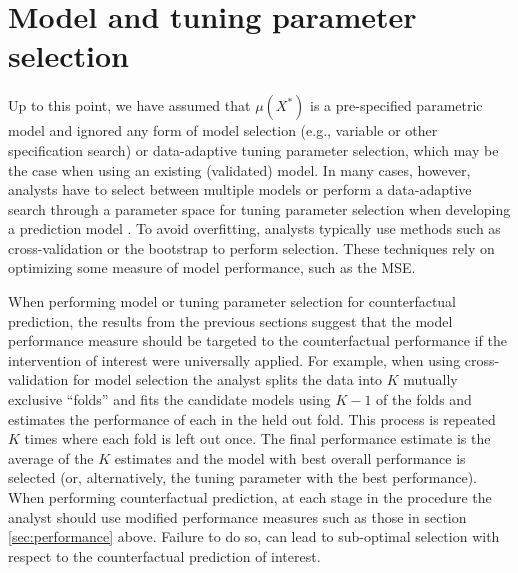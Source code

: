 \section{Model and tuning parameter selection} \label{sec:selection}

Up to this point, we have assumed that $\mu(X^*)$ is a pre-specified parametric model and ignored any form of model selection (e.g., variable or other specification search) or data-adaptive tuning parameter selection, which may be the case when using an existing (validated) model. In many cases, however, analysts have to select between multiple models or perform a data-adaptive search through a parameter space for tuning parameter selection when developing a prediction model \cite{steyerberg_clinical_2019}. To avoid overfitting, analysts typically use methods such as cross-validation or the bootstrap to perform selection. These techniques rely on optimizing some measure of model performance, such as the MSE.

When performing model or tuning parameter selection for counterfactual prediction, the results from the previous sections suggest that the model performance measure should be targeted to the counterfactual performance if the intervention of interest were universally applied. For example, when using cross-validation for model selection the analyst splits the data into $K$ mutually exclusive ``folds'' and fits the candidate models using $K - 1$ of the folds and estimates the performance of each in the held out fold. This process is repeated $K$ times where each fold is left out once. The final performance estimate is the average of the $K$ estimates and the model with best overall performance is selected (or, alternatively, the tuning parameter with the best performance). When performing counterfactual prediction, at each stage in the procedure the analyst should use modified performance measures such as those in section \ref{sec:performance} above. Failure to do so, can lead to sub-optimal selection with respect to the counterfactual prediction of interest. 



